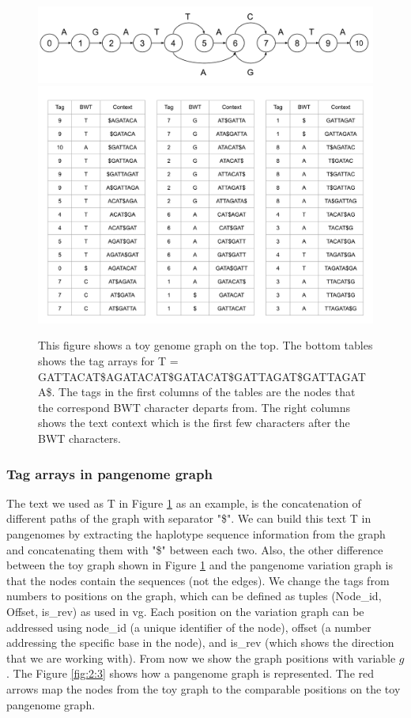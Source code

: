 \documentclass[11pt]{ucthesis}
\begin{document}
\begin{figure}
    \centering
    \includegraphics[width=\linewidth]{Images/Basic graph.pdf}
    \includegraphics[width=\linewidth]{Images/Tag Arrays.pdf}
    \caption[Tag arrays for a simple graph]{This figure shows a toy genome graph on the top. The bottom tables shows the tag arrays for T = GATTACAT\$AGATACAT\$GATACAT\$GATTAGAT\$GATTAGATA\$. The tags in the first columns of the tables are the nodes that the correspond BWT character departs from. The right columns shows the text context which is the first few characters after the BWT characters.}
    \label{fig:2:2}
\end{figure}

\subsubsection{Tag arrays in pangenome graph}
The text we used as T in Figure \ref{fig:2:2} as an example, is the concatenation of different paths of the graph with separator "\$". We can build this text T in pangenomes by extracting the haplotype sequence information from the graph and concatenating them with "\$" between each two. Also, the other difference between the toy graph shown in Figure \ref{fig:2:2} and the pangenome variation graph is that the nodes contain the sequences (not the edges). We change the tags from numbers to positions on the graph, which can be defined as tuples (Node\_id, Offset, is\_rev) as used in vg. Each position on the variation graph can be addressed using node\_id (a unique identifier of the node), offset (a number addressing the specific base in the node), and is\_rev (which shows the direction that we are working with). From now we show the graph positions with variable $g$. The Figure \ref{fig:2:3} shows how a pangenome graph is represented. The red arrows map the nodes from the toy graph to the comparable positions on the toy pangenome graph. 
\end{document}
